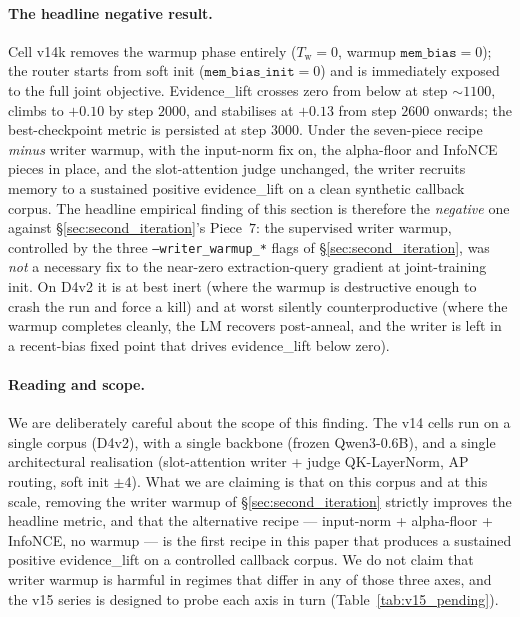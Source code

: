 \paragraph{The headline negative result.}
Cell v14k removes the warmup phase entirely
($T_{\text{w}}{=}0$, warmup $\texttt{mem\_bias}{=}0$); the router
starts from soft init ($\texttt{mem\_bias\_init}{=}0$) and is
immediately exposed to the full joint objective. Evidence\_lift
crosses zero from below at step $\sim 1100$, climbs to $+0.10$ by
step $2000$, and stabilises at $+0.13$ from step $2600$ onwards;
the best-checkpoint metric is persisted at step $3000$. Under the
seven-piece recipe \emph{minus} writer warmup, with the input-norm
fix on, the alpha-floor and InfoNCE pieces in place, and the
slot-attention judge unchanged, the writer recruits memory to a
sustained positive evidence\_lift on a clean synthetic callback
corpus. The headline empirical finding of this section is therefore
the \emph{negative} one against \S\ref{sec:second_iteration}'s
Piece~$7$: the supervised writer warmup, controlled by the three
\texttt{--writer\_warmup\_*} flags of \S\ref{sec:second_iteration},
was \emph{not} a necessary fix to the near-zero extraction-query
gradient at joint-training init. On D4v2 it is at best inert (where the warmup is destructive
enough to crash the run and force a kill) and at worst silently
counterproductive (where the warmup completes cleanly, the LM
recovers post-anneal, and the writer is left in a recent-bias
fixed point that drives evidence\_lift below zero).

\paragraph{Reading and scope.}
We are deliberately careful about the scope of this finding. The
v14 cells run on a single corpus (D4v2), with a single backbone
(frozen Qwen3-0.6B), and a single architectural realisation
(slot-attention writer + judge QK-LayerNorm, AP routing, soft init
$\pm 4$). What we are claiming is that on this corpus and at this
scale, removing the writer warmup of \S\ref{sec:second_iteration}
strictly improves the headline metric, and that the alternative
recipe --- input-norm + alpha-floor + InfoNCE, no warmup --- is the
first recipe in this paper that produces a sustained positive
evidence\_lift on a controlled callback corpus. We do not claim
that writer warmup is harmful in regimes that differ in any of
those three axes, and the v15 series is designed to probe each
axis in turn (Table~\ref{tab:v15_pending}).

